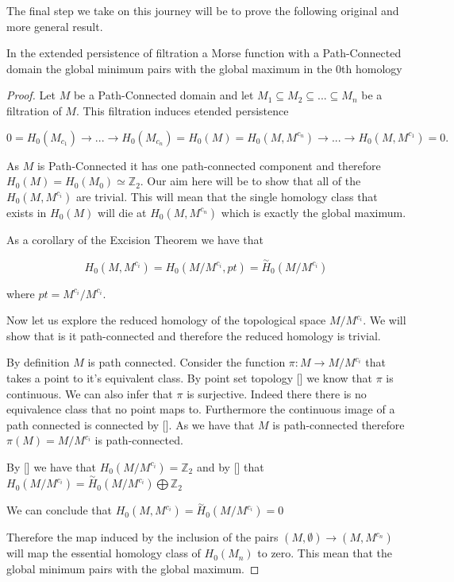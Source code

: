 The final step we take on this journey will be to prove the following original and more general result.

\begin{prop} In the extended persistence of filtration a Morse function with a Path-Connected domain the global minimum pairs with the global maximum in the 0th homology \end{prop}

\begin{proof}
    Let $M$ be a Path-Connected domain and let $M_1 \subseteq M_2 \subseteq ... \subseteq M_n$ be a filtration of $M$. This filtration induces etended persistence 

$$ 0 = H_0(M_{c_1}) \rightarrow ... \rightarrow H_0(M_{c_n}) = H_0(M) = H_0(M, M^{c_n}) \rightarrow ... \rightarrow H_0(M, M^{c_{1}}) = 0.$$

As $M$ is Path-Connected it has one path-connected component and therefore $H_0(M) = H_0(M_0) \simeq  \mathbb{Z}_2$.  Our aim here will be to show that all of the $H_0(M, M^{c_i})$ are trivial. This will mean that the single homology class that exists in $H_0(M)$ will die at $H_0(M, M^{c_n})$ which is exactly the global maximum.


As a corollary of the Excision Theorem we have that

$$H_0(M, M^{c_i}) = H_0(M / M^{c_i}, pt) = \overset{\sim}{H}_0(M / M^{c_i})$$  

where $pt = M^{c_i} / M^{c_i}$.

Now let us explore the reduced homology of the topological space $M / M^{c_i}$. We will show that is it path-connected and therefore the reduced homology is trivial.


By definition $M$ is path connected. Consider the function $\pi: M \to M/ M^{c_i}$ that takes a point to it's equivalent class. By point set topology [] we know that $\pi$ is continuous. We can also infer that $\pi$ is surjective. Indeed there there is no equivalence class that no point maps to. Furthermore the continuous image of a path connected is connected by []. As we have that $M$ is path-connected therefore $\pi(M) = M / M^{c_i}$ is path-connected. 

By [] we have that $H_0(M / M^{c_i}) = \mathbb{Z}_2$ and by [] that $H_0(M / M^{c_i}) = \overset{\sim}{H}_0(M / M^{c_i}) \bigoplus \mathbb{Z}_2$

We can conclude that $H_0(M, M^{c_i}) = \overset{\sim}{H}_0(M / M^{c_i}) = 0$

Therefore the map induced by the inclusion of the pairs $(M, \emptyset) \to (M, M^{c_n})$ will map the essential homology class of $H_0(M_n)$ to zero. This mean that the global minimum pairs with the global maximum.

\end{proof}


